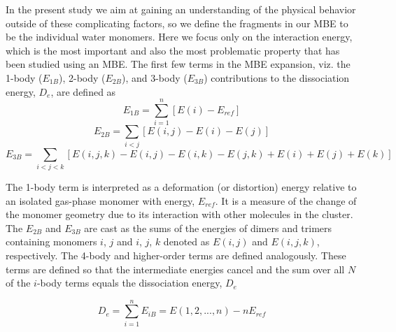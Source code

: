 \documentclass [11pt, proquest] {uwthesis}[2020/02/24]
\begin{document}
\par In the present study we aim at gaining an understanding of the physical behavior outside of these complicating factors, so we define the fragments in our MBE to be the individual water monomers. Here we focus only on the interaction energy, which is the most important and also the most problematic property that has been studied using an MBE. The first few terms in the MBE expansion, viz. the 1-body ($E_{1B}$), 2-body ($E_{2B}$), and 3-body ($E_{3B}$) contributions to the dissociation energy, $D_e$, are defined as\autocite{hankins_hydrogen-bond_1970, xantheas_ab_1994}
$$
E_{1B}=\sum_{i=1}^n[E(i)-E_{ref}]
$$
$$
E_{2B}=\sum_{i<j}[E(i,j)-E(i)-E(j)]
$$
$$
E_{3B}=\sum_{i<j<k}[E(i,j,k)-E(i,j)-E(i,k)-E(j,k)+E(i)+E(j)+E(k)]
$$

The 1-body term is interpreted as a deformation (or distortion) energy\autocite{white_analysis_1990, xantheas_importance_1996} relative to an isolated gas-phase monomer with energy, $E_{ref}$. It is a measure of the change of the monomer geometry due to its interaction with other molecules in the cluster. The $E_{2B}$ and $E_{3B}$ are cast as the sums of the energies of dimers and trimers containing monomers $i$, $j$ and $i$, $j$, $k$ denoted as $E(i,j)$ and $E(i,j,k)$, respectively. The 4-body and higher-order terms are defined analogously. These terms are defined so that the intermediate energies cancel and the sum over all $N$ of the $i$-body terms equals the dissociation energy, $D_e$

$$
D_e=\sum_{i=1}^nE_{iB}=E(1,2,...,n)-nE_{ref}
$$
\end{document}
